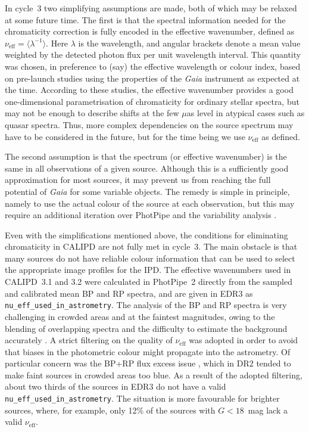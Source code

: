 \documentclass[longauth]{aa} %
\newcommand{\gacs}[1]{{\footnotesize\texttt{#1}}}
\begin{document}
In cycle~3 two simplifying assumptions are made, both of which may be relaxed at
some future time. The first is that the spectral information needed for the chromaticity
correction is fully encoded
in the effective wavenumber, defined as $\nu_\text{eff}=\langle\lambda^{-1}\rangle$. 
Here $\lambda$ is the wavelength, and angular brackets denote a mean value 
weighted by the detected photon flux per unit wavelength interval. 
This quantity was chosen, in preference to (say) the effective wavelength or 
colour index, based on pre-launch studies using the properties of the \textit{Gaia} 
instrument as expected at the time. According to these studies, the effective wavenumber 
provides a good one-dimensional parametrisation of chromaticity for ordinary 
stellar spectra, but may not be enough to describe shifts at the few $\mu$as 
level in atypical cases such as quasar spectra. Thus, more complex dependencies on 
the source spectrum may have to be considered in the future, but for the time being 
we use $\nu_\text{eff}$ as defined.


The second assumption is that the spectrum (or effective wavenumber) is the 
same in all observations of a given source. Although this is a sufficiently good 
approximation for most sources, it may prevent us from reaching the full potential 
of \textit{Gaia} for some variable objects. The remedy is simple in principle, namely
to use the actual colour of the source at each observation, but this may require 
an additional iteration over PhotPipe and the variability analysis 
.

Even with the simplifications mentioned above, the conditions for eliminating 
chromaticity in CALIPD are not fully met in cycle~3. The main obstacle is that many 
sources do not have reliable colour information that can be used to select the 
appropriate image profiles for the IPD. The effective wavenumbers used in 
CALIPD~3.1 and 3.2 were calculated in PhotPipe~2 directly from the sampled and 
calibrated mean BP and RP spectra, and are given in EDR3 as 
\gacs{nu\_eff\_used\_in\_astrometry}. The analysis of the BP and RP spectra 
is very challenging in crowded areas and at the faintest magnitudes, owing to 
the blending of overlapping spectra and the difficulty to estimate the background 
accurately \citep{EDR3-DPACP-118}. A strict filtering on the quality of 
$\nu_\text{eff}$ was adopted in order to avoid that biases in the photometric
colour might propagate into the astrometry. Of particular concern was the BP+RP 
flux excess issue , which in DR2 tended to make faint 
sources in crowded areas too blue. As a result of the adopted filtering, about
two thirds of the sources in EDR3 do not have a valid \gacs{nu\_eff\_used\_in\_astrometry}.
The situation is more favourable for brighter sources, where, for example, only 
12\% of the sources with $G<18$~mag lack a valid $\nu_\text{eff}$.
\end{document}
